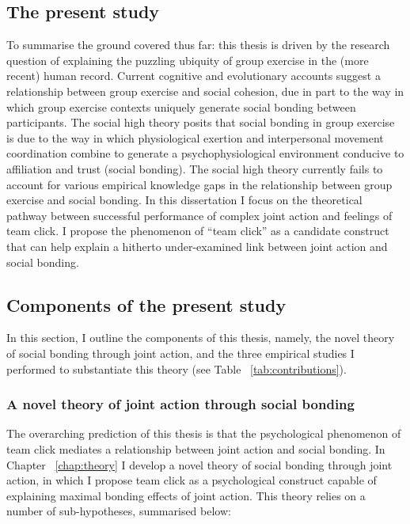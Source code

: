 \begin{CJK}{UTF8}{gbsn}
\section{The present study\label{sect:presentStudy}}
To summarise the ground covered thus far: this thesis is driven by the research question of explaining the puzzling ubiquity of group exercise in the (more recent) human record. Current cognitive and evolutionary accounts suggest a relationship between group exercise and social cohesion, due in part to the way in which group exercise contexts uniquely generate social bonding between participants.  The social high theory posits that social bonding in group exercise is due to the way in which physiological exertion and interpersonal movement coordination combine to generate a psychophysiological environment conducive to affiliation and trust (social bonding).  The social high theory currently fails to account for various empirical knowledge gaps in the relationship between group exercise and social bonding.  In this dissertation I focus on the theoretical pathway between successful performance of complex joint action and feelings of team click.  I propose the phenomenon of ``team click'' as a candidate construct that can help explain a hitherto under-examined link between joint action and social bonding.


\subsection{Components of the present study\label{sect:components}}



In this section, I outline the components of this thesis, namely, the novel theory of social bonding through joint action, and the three empirical studies I performed to substantiate this theory (see Table ~\ref{tab:contributions}).


\subsubsection{A novel theory of joint action through social bonding}

  The overarching prediction of this thesis is that the psychological phenomenon of team click mediates a relationship between joint action and social bonding.  In Chapter ~\ref{chap:theory} I develop a novel theory of social bonding through joint action, in which I propose team click as a psychological construct capable of explaining maximal bonding effects of joint action.  This theory relies on a number of sub-hypotheses, summarised below:


\end{CJK}
